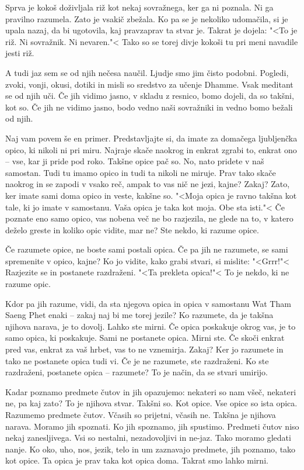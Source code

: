 Sprva je kokoš doživljala riž kot nekaj sovražnega, ker ga ni poznala. Ni ga pravilno razumela. Zato je vsakič zbežala. Ko pa se je nekoliko udomačila, si je upala nazaj, da bi ugotovila, kaj pravzaprav ta stvar je. Takrat je dojela: "<To je riž. Ni sovražnik. Ni nevaren."< Tako so se torej divje kokoši tu pri meni navadile jesti riž.

A tudi jaz sem se od njih nečesa naučil. Ljudje smo jim čisto podobni. Pogledi, zvoki, vonji, okusi, dotiki in misli so sredstvo za učenje Dhamme. Vsak meditant se od njih uči. Če jih vidimo jasno, v skladu z resnico, bomo dojeli, da so takšni, kot so. Če jih ne vidimo jasno, bodo vedno naši sovražniki in vedno bomo bežali od njih.

\clearpage


Naj vam povem še en primer. Predstavljajte si, da imate za domačega ljubljenčka opico, ki nikoli ni pri miru. Najraje skače naokrog in enkrat zgrabi to, enkrat ono – vse, kar ji pride pod roko. Takšne opice pač so. No, nato pridete v naš samostan. Tudi tu imamo opico in tudi ta nikoli ne miruje. Prav tako skače naokrog in se zapodi v vsako reč, ampak to vas nič ne jezi, kajne? Zakaj? Zato, ker imate sami doma opico in veste, kakšne so. "<Moja opica je ravno takšna kot tale, ki jo imate v samostanu. Vaša opica je taka kot moja. Obe sta isti."< Če poznate eno samo opico, vas nobena več ne bo razjezila, ne glede na to, v katero deželo greste in koliko opic vidite, mar ne? Ste nekdo, ki razume opice.

Če razumete opice, ne boste sami postali opica. Če pa jih ne razumete, se sami spremenite v opico, kajne? Ko jo vidite, kako grabi stvari, si mislite: "<Grrr!"< Razjezite se in postanete razdraženi. "<Ta prekleta opica!"< To je nekdo, ki ne razume opic.

Kdor pa jih razume, vidi, da sta njegova opica in opica v samostanu Wat Tham Saeng Phet enaki – zakaj naj bi me torej jezile? Ko razumete, da je takšna njihova narava, je to dovolj. Lahko ste mirni. Če opica poskakuje okrog vas, je to samo opica, ki poskakuje. Sami ne postanete opica. Mirni ste. Če skoči enkrat pred vas, enkrat za vaš hrbet, vas to ne vznemirja. Zakaj? Ker jo razumete in tako ne postanete opica tudi vi. Če je ne razumete, ste razdraženi. Ko ste razdraženi, postanete opica – razumete? To je način, da se stvari umirijo.

Kadar poznamo predmete čutov in jih opazujemo: nekateri so nam všeč, nekateri ne, pa kaj zato? To je njihova stvar. Takšni so. Kot opice. Vse opice so ista opica. Razumemo predmete čutov. Včasih so prijetni, včasih ne. Takšna je njihova narava. Moramo jih spoznati. Ko jih spoznamo, jih spustimo. Predmeti čutov niso nekaj zanesljivega. Vsi so nestalni, nezadovoljivi in ne-jaz. Tako moramo gledati nanje. Ko oko, uho, nos, jezik, telo in um zaznavajo predmete, jih poznamo, tako kot opice. Ta opica je prav taka kot opica doma. Takrat smo lahko mirni.

